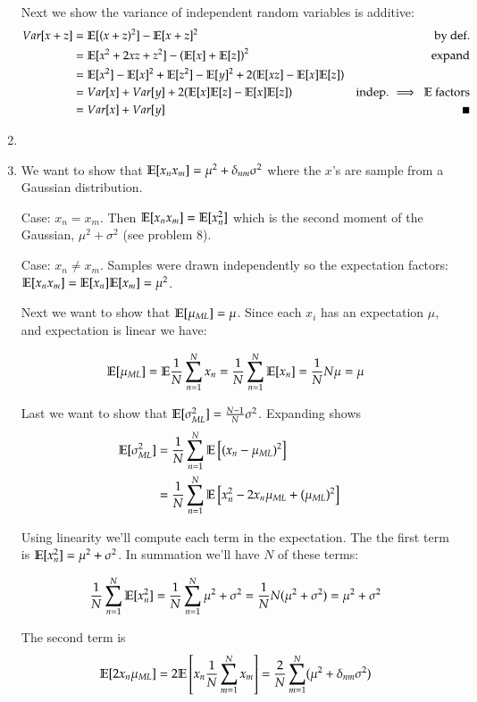 \documentclass[../main.tex]{subfiles}
\begin{document}
\begin{enumerate}
Next we show the variance of independent random variables is additive:
\begin{align*}
	Var[x + z] &= \mathbb{E}[(x + z)^2] - \mathbb{E}[x + z]^2 &\text{by def.}\\
	&=\mathbb{E}[x^2 + 2xz + z^2] - \left(\mathbb{E}[x] + \mathbb{E}[z]\right)^2 &\text{expand}\\
	&=\mathbb{E}[x^2] - \mathbb{E}[x]^2 + \mathbb{E}[z^2] - \mathbb{E}[y]^2 + 2(\mathbb{E}[xz] - \mathbb{E}[x]\mathbb{E}[z]) &\\
	&=Var[x] + Var[y] + 2(\mathbb{E}[x]\mathbb{E}[z] - \mathbb{E}[x]\mathbb{E}[z]) &\text{indep. $\implies \ \mathbb{E}$ factors}\\
	&= Var[x] + Var[y] &\blacksquare
\end{align*}

\item

\item We want to show that $\mathbb{E}[x_n x_m] = \mu^2 + \delta_{nm}\sigma^2$ where the $x$'s are sample from a Gaussian distribution.

Case: $x_n = x_m$. Then $\mathbb{E}[x_n x_m] = \mathbb{E}[x_n^2]$ which is the second moment of the Gaussian, $\mu^2 + \sigma^2$ (see problem 8).

Case: $x_n \neq x_m$. Samples were drawn independently so the expectation factors: $\mathbb{E}[x_nx_m] = \mathbb{E}[x_n]\mathbb{E}[x_m] = \mu^2$.

Next we want to show that $\mathbb{E}[\mu_{ML}] = \mu$. Since each $x_i$ has an expectation $\mu$, and expectation is linear we have:

$$\mathbb{E}[\mu_{ML}] = \mathbb{E} \frac{1}{N}\sum_{n=1}^N x_n = \frac{1}{N}\sum_{n=1}^N \mathbb{E}[x_n] = \frac{1}{N}N\mu = \mu$$ 

Last we want to show that $\mathbb{E}[\sigma^2_{ML}] = \frac{N-1}{N}\sigma^2$. Expanding shows
\begin{align*}
	\mathbb{E}[\sigma^2_{ML}] &= \frac{1}{N}\sum_{n=1}^N \mathbb{E}\left[(x_n - \mu_{ML})^2\right] &\\
	&= \frac{1}{N}\sum_{n=1}^N \mathbb{E}\left[x_n^2 - 2x_n\mu_{ML} + (\mu_{ML})^2\right] &\\
\end{align*}

Using linearity we'll compute each term in the expectation. The the first term is $\mathbb{E}[x_n^2] = \mu^2 + \sigma^2$. In summation we'll have $N$ of these terms:

$$\frac{1}{N}\sum_{n=1}^N \mathbb{E}[x_n^2] = \frac{1}{N}\sum_{n=1}^N \mu^2 + \sigma^2 = \frac{1}{N}N(\mu^2 + \sigma^2) = \mu^2 + \sigma^2$$

The second term is
$$\mathbb{E}[2x_n \mu_{ML}] = 2\mathbb{E}\left[x_n \frac{1}{N}\sum_{m=1}^N x_m\right] = \frac{2}{N}\sum_{m=1}^N(\mu^2 + \delta_{nm}\sigma^2)$$


\end{enumerate}
\end{document}
